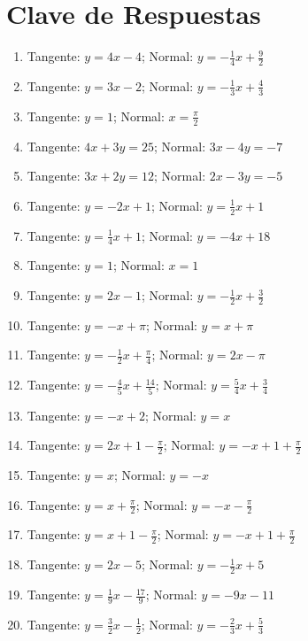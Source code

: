 \documentclass[12pt, letterpaper]{article}
\begin{document}
\newpage
\ifmwclaves
  \section{Clave de Respuestas}

  \begin{enumerate}[leftmargin=*, label=\textbf{\arabic*.}]
    \item Tangente: $y = 4x - 4$; Normal: $y = -\frac{1}{4}x + \frac{9}{2}$
    \item Tangente: $y = 3x - 2$; Normal: $y = -\frac{1}{3}x + \frac{4}{3}$
    \item Tangente: $y = 1$; Normal: $x = \frac{\pi}{2}$
    \item Tangente: $4x + 3y = 25$; Normal: $3x - 4y = -7$
    \item Tangente: $3x + 2y = 12$; Normal: $2x - 3y = -5$
    \item Tangente: $y = -2x + 1$; Normal: $y = \frac{1}{2}x + 1$
    \item Tangente: $y = \frac{1}{4}x + 1$; Normal: $y = -4x + 18$
    \item Tangente: $y = 1$; Normal: $x = 1$
    \item Tangente: $y = 2x - 1$; Normal: $y = -\frac{1}{2}x + \frac{3}{2}$
    \item Tangente: $y = -x + \pi$; Normal: $y = x + \pi$
    \item Tangente: $y = -\frac{1}{2}x + \frac{\pi}{4}$; Normal: $y = 2x - \pi$
    \item Tangente: $y = -\frac{4}{5}x + \frac{14}{5}$; Normal: $y = \frac{5}{4}x + \frac{3}{4}$
    \item Tangente: $y = -x + 2$; Normal: $y = x$
    \item Tangente: $y = 2x + 1 - \frac{\pi}{2}$; Normal: $y = -x + 1 + \frac{\pi}{2}$
    \item Tangente: $y = x$; Normal: $y = -x$
    \item Tangente: $y = x + \frac{\pi}{2}$; Normal: $y = -x - \frac{\pi}{2}$
    \item Tangente: $y = x + 1 - \frac{\pi}{2}$; Normal: $y = -x + 1 + \frac{\pi}{2}$
    \item Tangente: $y = 2x - 5$; Normal: $y = -\frac{1}{2}x + 5$
    \item Tangente: $y = \frac{1}{9}x - \frac{17}{9}$; Normal: $y = -9x - 11$
    \item Tangente: $y = \frac{3}{2}x - \frac{1}{2}$; Normal: $y = -\frac{2}{3}x + \frac{5}{3}$

\end{enumerate}
\end{document}
